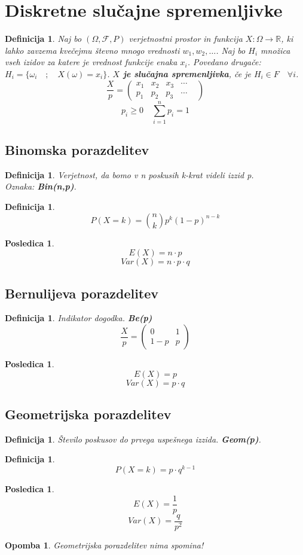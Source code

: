 \documentclass[11pt]{article}
\newtheorem{Posledica}[Izrek]{{\sc Posledica}}
\newtheorem{Definicija}[Izrek]{{\sc Definicija}}
\newtheorem{Opomba}[Izrek]{{\sc Opomba}}
\begin{document}
\section{Diskretne slučajne spremenljivke}
\begin{Definicija}
	Naj bo $(\Omega, \mathcal{F}, P) $ verjetnostni prostor in funkcija $X: \Omega \to \mathbb{R}$, ki lahko zavzema kvečejmu števno mnogo vrednosti $w_1, w_2,\dots $. Naj bo $H_i$ množica vseh izidov za katere je vrednost funkcije enaka $x_i$. Povedano drugače:
	$H_i = \{ \omega_i \quad;\quad X(\omega) = x_i\}$. \textbf{$X$ je slučajna spremenljivka}, če je $H_i \in F \quad \forall i$.
	\\
	\[
	  \frac{X}{p} = \begin{pmatrix}
	  	x_1 & x_2 & x_3 & \cdots & \\       p_1 & p_2 & p_3 & \cdots & 
	  \end{pmatrix}
	 \]
	 $$p_i \ge 0 \quad \sum_{i=1}^{n}{p_i} = 1$$
\end{Definicija}

\subsection{Binomska porazdelitev}
\begin{Definicija}
	Verjetnost, da bomo v n poskusih k-krat videli izzid p.
	\\
	Oznaka: \textbf{Bin(n,p)}.
\end{Definicija}
\begin{Definicija}
	$$P(X=k) = \binom{n}{k} p^k (1-p)^{n-k}$$
\end{Definicija}
\begin{Posledica}
	$$E(X) = n\cdot p$$
	$$Var(X) = n\cdot p\cdot q$$
\end{Posledica}
\subsection{Bernulijeva porazdelitev}
\begin{Definicija}
	Indikator dogodka. \textbf{Be(p)}
		\[
		\frac{X}{p} = \begin{pmatrix}
		0 & 1 \\       1-p & p  
		\end{pmatrix}
		\]
\end{Definicija}
\begin{Posledica}
	$$E(X) = p$$
	$$Var(X) = p\cdot q$$
\end{Posledica}
\subsection{Geometrijska porazdelitev}
\begin{Definicija}
	Število poskusov do prvega uspešnega izzida. \textbf{Geom(p)}.
\end{Definicija}
\begin{Definicija}
	$$P(X=k) = p \cdot q^{k-1}$$
\end{Definicija}
\begin{Posledica}
	$$E(X) = \frac{1}{p}$$
	$$Var(X) = \frac{q}{p^2}$$
\end{Posledica}
\begin{Opomba}
	Geometrijska porazdelitev nima spomina!
\end{Opomba}
\end{document}

